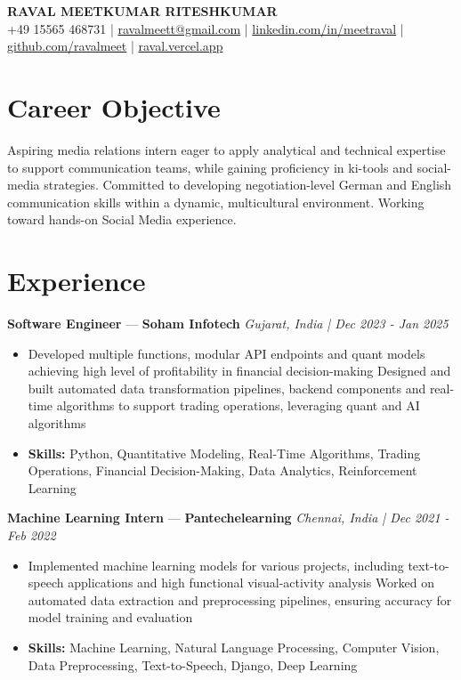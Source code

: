 \documentclass[a4paper,10pt]{article}
\begin{document}
\begin{center}
  {\Large\bfseries RAVAL MEETKUMAR RITESHKUMAR}\\[2pt]
  {\small +49 15565 468731 \;|\; \href{mailto:ravalmeett@gmail.com}{ravalmeett@gmail.com} \;|\; \href{https://www.linkedin.com/in/meetraval/}{linkedin.com/in/meetraval} \;|\; \href{https://github.com/ravalmeet}{github.com/ravalmeet} \;|\; \href{https://raval.vercel.app/}{raval.vercel.app}}
\end{center}
\vspace{-3pt}

\section*{Career Objective}
Aspiring media relations intern eager to apply analytical and technical expertise to support communication teams, while gaining proficiency in ki-tools and social-media strategies. Committed to developing negotiation-level German and English communication skills within a dynamic, multicultural environment. Working toward hands-on Social Media experience.\par

\section*{Experience}
\textbf{Software Engineer} — \textbf{Soham Infotech} \hfill \textit{Gujarat, India \;|\; Dec 2023 - Jan 2025}\par
\vspace{1pt}
\begin{itemize}
  \item Developed multiple functions, modular API endpoints and quant models achieving high level of profitability in financial decision-making Designed and built automated data transformation pipelines, backend components and real-time algorithms to support trading operations, leveraging quant and AI algorithms
  \item \textbf{Skills:} Python, Quantitative Modeling, Real-Time Algorithms, Trading Operations, Financial Decision-Making, Data Analytics, Reinforcement Learning
\end{itemize}
\vspace{3pt}
\textbf{Machine Learning Intern} — \textbf{Pantechelearning} \hfill \textit{Chennai, India \;|\; Dec 2021 - Feb 2022}\par
\vspace{1pt}
\begin{itemize}
  \item Implemented machine learning models for various projects, including text-to-speech applications and high functional visual-activity analysis Worked on automated data extraction and preprocessing pipelines, ensuring accuracy for model training and evaluation
  \item \textbf{Skills:} Machine Learning, Natural Language Processing, Computer Vision, Data Preprocessing, Text-to-Speech, Django, Deep Learning
\end{itemize}
\end{document}
